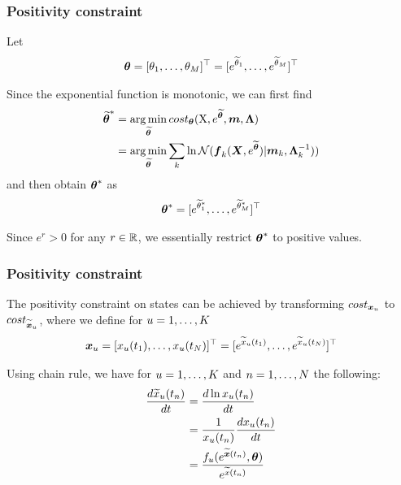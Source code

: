 \begin{frame}[t]
    \frametitle{Positivity constraint}
    Let
    \begin{align}
        \boldsymbol{\theta} = [\theta_{1},\dots,\theta_{M}]^\top = [e^{\widetilde{\theta}_{1}},\dots,e^{\widetilde{\theta}_{M}}]^\top        
    \end{align}
    
    Since the exponential function is monotonic, we can first find
    \begin{align}
        \boldsymbol{\widetilde{\theta}}^* 
        & = 
        \operatorname*{arg\,min}_{\boldsymbol{\widetilde{\theta}}}{
            cost_{\boldsymbol{\theta}}(\mathrm{X},e^{\boldsymbol{\widetilde{\theta}}},\boldsymbol{m},\boldsymbol{\Lambda})
        }
        \nonumber
        \\
        & = 
        \operatorname*{arg\,min}_{\boldsymbol{\widetilde{\theta}}}{
            \sum_k{
                \ln{
                    \mathcal{N}(\boldsymbol{f}_k(\boldsymbol{X}, e^{\widetilde{\boldsymbol{\theta}}}) \vert\boldsymbol{m}_{k},\boldsymbol{\Lambda}_{k}^{-1}))}}}    
    \end{align}
    and then obtain $\boldsymbol{\theta}^*$ as
    \begin{align}
        \boldsymbol{\theta}^* = [e^{\widetilde{\theta}_{1}^*},\dots,e^{\widetilde{\theta}_{M}^*}]^\top
    \end{align}
    
    Since $e^r > 0$ for any $r \in \mathbb{R}$, we essentially restrict $\boldsymbol{\theta}^*$ to positive values.
\end{frame}

\begin{frame}[t]
    \frametitle{Positivity constraint}
    The positivity constraint on states can be achieved by transforming $cost_{\boldsymbol{x}_{u}}$ to $cost_{\boldsymbol{\widetilde{x}}_{u}}$, where we define for $u = 1,\dots,K$
    \begin{align}
        \boldsymbol{x}_{u} = [x_{u}(t_{1}),\dots,x_{u}(t_{N})]^\top = [e^{\widetilde{x}_{u}(t_{1})},\dots,e^{\widetilde{x}_{u}(t_{N})}]^\top
    \end{align}
    
    \vspace{\baselineskip}
    Using chain rule, we have for $u = 1,\dots,K$ and $n = 1,\dots,N$ the following:
    \begin{align}
        \frac{d\widetilde{x}_{u}(t_n)}{dt}
        & =
        \frac{d\ln{{x}_{u}(t_n)}}{dt}
        \nonumber
        \\
        & =
        \frac{1}{{x}_{u}(t_n)}\frac{d{x}_{u}(t_n)}{dt}
        \nonumber
        \\
        & =  
        \frac{
            f_{u}(
            e^{\boldsymbol{\widetilde{x}}(t_n)}, \boldsymbol{\theta})}{e^{\widetilde{x}(t_n)}}
    \end{align}
\end{frame}

